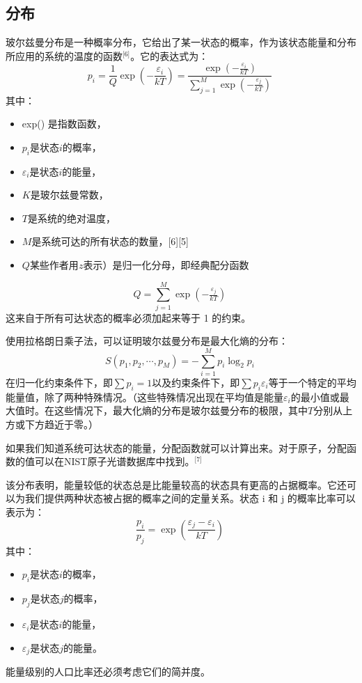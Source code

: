 \subsection{分布}  
玻尔兹曼分布是一种概率分布，它给出了某一状态的概率，作为该状态能量和分布所应用的系统的温度的函数\(^\text{[6]}\)。它的表达式为：
\[
p_i = \frac{1}{Q} \exp\left(-\frac{\varepsilon_i}{kT}\right) = \frac{\exp\left(-\frac{\varepsilon_i}{kT}\right)}{\sum _{j=1}^{M}\exp\left(-\frac{\varepsilon_j}{kT}\right)}~
\]
其中：
\begin{itemize}
\item exp() 是指数函数，  
\item \(p_i\)是状态\(i\)的概率，  
\item \(\varepsilon_i\)是状态\(i\)的能量，  
\item \(K\)是玻尔兹曼常数，  
\item \(T\)是系统的绝对温度，  
\item \(M\)是系统可达的所有状态的数量，[6][5]  
\item \(Q\)某些作者用\(z\)表示）是归一化分母，即经典配分函数  
\end{itemize} 
\[{\displaystyle Q=\sum _{j=1}^{M}\exp \left(-{\tfrac {\varepsilon _{j}}{kT}}\right)}~\]
这来自于所有可达状态的概率必须加起来等于 1 的约束。

使用拉格朗日乘子法，可以证明玻尔兹曼分布是最大化熵的分布：
\[
S(p_1, p_2, \cdots, p_M) = -\sum_{i=1}^{M} p_i \log_2 p_i~
\]
在归一化约束条件下，即\(\sum p_i = 1\)以及约束条件下，即\(\sum p_i \varepsilon_i\)等于一个特定的平均能量值，除了两种特殊情况。（这些特殊情况出现在平均值是能量\(\varepsilon_i\)的最小值或最大值时。在这些情况下，最大化熵的分布是玻尔兹曼分布的极限，其中\(T\)分别从上方或下方趋近于零。）

如果我们知道系统可达状态的能量，分配函数就可以计算出来。对于原子，分配函数的值可以在NIST原子光谱数据库中找到。\(^\text{[7]}\)

该分布表明，能量较低的状态总是比能量较高的状态具有更高的占据概率。它还可以为我们提供两种状态被占据的概率之间的定量关系。状态 i 和 j 的概率比率可以表示为：
\[
\frac{p_i}{p_j} = \exp \left( \frac{\varepsilon_j - \varepsilon_i}{kT} \right)~
\]
其中：
\begin{itemize}
\item \( p_i \)是状态\(i\)的概率，  
\item \( p_j \)是状态\(j\)的概率，  
\item \( \varepsilon_i \)是状态\(i\)的能量，  
\item \( \varepsilon_j \)是状态\(j\)的能量。
\end{itemize}
能量级别的人口比率还必须考虑它们的简并度。

